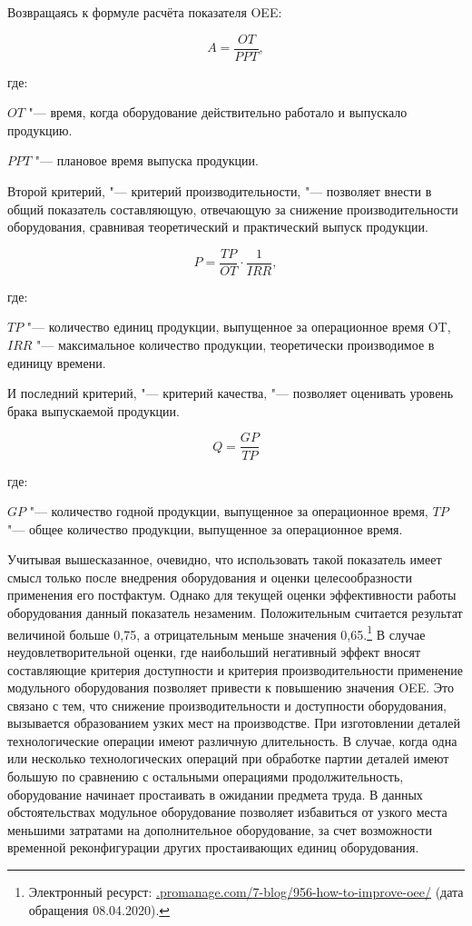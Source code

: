 Возвращаясь к формуле расчёта показателя OEE:

\begin{equation}
	A = \frac{OT}{PPT},
\end{equation}

\noindent где:

\noindent $OT$ "---  время, когда оборудование действительно работало и выпускало продукцию.

\noindent $PPT$ "--- плановое время выпуска продукции.

Второй критерий, "--- критерий производительности, "--- позволяет внести в общий показатель составляющую, отвечающую за снижение производительности оборудования, сравнивая теоретический и практический выпуск продукции.

\begin{equation}
	P = \frac{TP}{OT} \cdot \frac{1}{IRR},
\end{equation}

\noindent где:
 
\noindent $TP$ "--- количество единиц продукции, выпущенное за операционное время OT,
\noindent $IRR$ "--- максимальное количество продукции, теоретически производимое в единицу времени.

И последний критерий, "--- критерий качества, "--- позволяет оценивать уровень брака выпускаемой продукции.

\begin{equation}
	Q = \frac{GP}{TP}
\end{equation}

\noindent где:

\noindent $GP$ "--- количество годной продукции, выпущенное за операционное время,
\noindent $TP$ "--- общее количество продукции, выпущенное за операционное время.

Учитывая вышесказанное, очевидно, что использовать такой показатель имеет смысл только после внедрения оборудования и оценки целесообразности применения его постфактум. Однако для текущей оценки эффективности работы оборудования данный показатель незаменим. Положительным считается результат величиной больше 0,75, а отрицательным меньше значения 0,65.\footnote{Электронный ресурст: \url{.promanage.com/7-blog/956-how-to-improve-oee/} (дата обращения 08.04.2020).} В случае неудовлетворительной оценки, где наибольший негативный эффект вносят составляющие критерия доступности и критерия производительности применение модульного оборудования позволяет привести к повышению значения OEE. Это связано с тем, что снижение производительности и доступности оборудования, вызывается образованием узких мест на производстве. При изготовлении деталей технологические операции имеют различную длительность. В случае, когда одна или несколько технологических операций при обработке партии деталей имеют большую по сравнению с остальными операциями продолжительность, оборудование начинает простаивать в ожидании предмета труда. В данных обстоятельствах модульное оборудование позволяет избавиться от узкого места меньшими затратами на дополнительное оборудование, за счет возможности временной реконфигурации других простаивающих единиц оборудования. 

